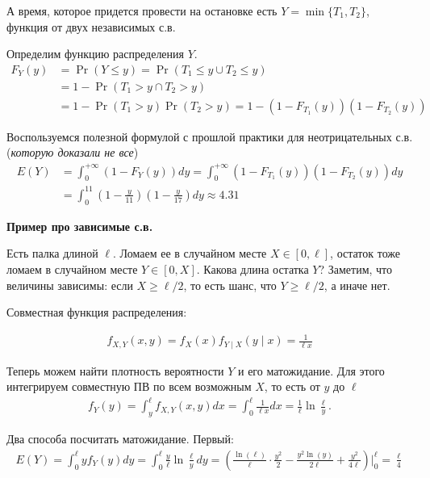 \documentclass[12pt]{article}
\begin{document}
А время, которое придется провести на остановке есть $Y = \min\{T_1, T_2\}$, функция от двух независимых с.в.

Определим функцию распределения $Y$.
\begin{align*}
  F_Y(y) &= \Pr(Y \le y) = \Pr(T_1 \le y \cup T_2 \le y) \\
         &= 1 - \Pr(T_1 > y \cap T_2 > y) \\
         &= 1 - \Pr(T_1 > y) \Pr(T_2 > y) = 1 - (1 - F_{T_1}(y))(1 - F_{T_2}(y))
\end{align*}

Воспользуемся полезной формулой с прошлой практики для неотрицательных с.в. (\emph{которую доказали не все})
\begin{align*}
  E(Y) &= \int_{0}^{+\infty} (1 - F_Y(y)) dy = \int_{0}^{+\infty} (1 - F_{T_1}(y))(1 - F_{T_2}(y))dy \\
  &= \int_{0}^{11} \left(1 - \frac{y}{11}\right)\left(1 - \frac{y}{17}\right) dy \approx 4.31
\end{align*}



\textbf{Пример про зависимые с.в.}

Есть палка длиной $\ell$. Ломаем ее в случайном месте $X\in [0, \ell]$, остаток тоже ломаем в случайном месте $Y \in [0, X]$. Какова длина остатка $Y$? Заметим, что величины зависимы: если $X \ge \ell/2$, то есть шанс, что $Y \ge \ell/2$, а иначе нет.

Совместная функция распределения:

\begin{align*}
  f_{X, Y} (x, y) = f_X(x) f_{Y \mid X}(y \mid x) = \frac{1}{\ell x}
\end{align*}

Теперь можем найти плотность вероятности $Y$ и его матожидание. Для этого интегрируем совместную ПВ по всем возможным $X$, то есть от $y$ до $\ell$ 
\begin{align*}
  f_Y(y) = \int_y^\ell f_{X, Y} (x, y) dx = \int_0^\ell \frac{1}{\ell x} dx = \frac{1}{\ell} \ln\frac{\ell}{y}.
\end{align*}

Два способа посчитать матожидание. Первый:
\begin{align*}
  E(Y) = \int_0^\ell y f_Y(y)dy = \int_0^\ell \frac{y}{\ell} \ln\frac{\ell}{y} dy = \left( \frac{\ln(\ell)}{\ell} \cdot \frac{y^2}{2} - \frac{y^2 \ln(y)}{2\ell} + \frac{y^2}{4\ell}\right) \bigg|_0^\ell = \frac{\ell}{4}
\end{align*}
\end{document}
